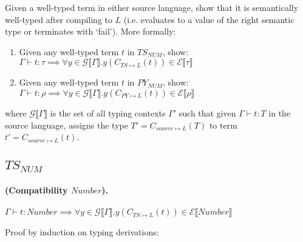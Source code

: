 \documentclass{article}
\newcommand{\denoteset}[2]{\mathcal{#1} \llbracket #2 \rrbracket}
\begin{document}
	Given a well-typed term in either source language, show that it is semantically well-typed after compiling to $L$ (i.e. evaluates to a value of the right semantic type or terminates with `fail'). More formally:
	
	\begin{enumerate}
		\item Given any well-typed term $t$ in $TS_{NUM}$, show:\\
		$\Gamma \vdash t: \tau \implies \forall y \in \denoteset{G}{\Gamma}. y(C_{TS \mapsto L}(t)) \in \denoteset{E}{\tau}$
		\item Given any well-typed term $t$ in $PY_{NUM}$, show:\\
		$\Gamma \vdash t: \rho \implies \forall y \in \denoteset{G}{\Gamma}. y(C_{PY \mapsto L}(t)) \in \denoteset{E}{\rho}$
	\end{enumerate}


	where $\denoteset{G}{\Gamma}$ is the set of all typing contexts $\Gamma'$ such that given $\Gamma \vdash t: T$ in the source language, assigns the type $T' = C_{source \mapsto L}(T)$ to term $t' = C_{source \mapsto L}(t)$.
	
	\subsection{$TS_{NUM}$}
	
	\paragraph{(Compatibility $Number$).}
	$\Gamma \vdash t: Number \implies \forall y \in \denoteset{G}{\Gamma}. y(C_{TS \mapsto L}(t)) \in \denoteset{E}{Number}$
	
	Proof by induction on typing derivations:
	
\end{document}
